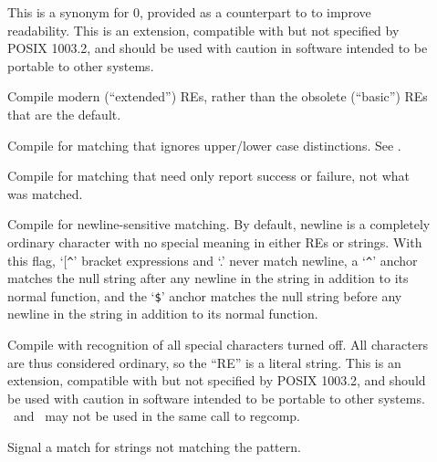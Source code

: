 \begin{description}

\item[] %
  This is a synonym for 0, provided as a counterpart to 
  to improve readability. This is an extension, compatible with but
  not specified by POSIX 1003.2, and should be used with caution in
  software intended to be portable to other systems.
\item[] %
  Compile modern (``extended'') REs, rather than the obsolete
  (``basic'') REs that are the default.
\item[] %
  Compile for matching that ignores upper/lower case distinctions. See
  .
\item[] %
  Compile for matching that need only report success or failure, not
  what was matched.
\item[] %
  Compile for newline-sensitive matching. By default, newline is a
  completely ordinary character with no special meaning in either REs
  or strings. With this flag, `[\verb|^|' bracket expressions and `.'
  never match newline, a `\verb|^|' anchor matches the null string
  after any newline in the string in addition to its normal function,
  and the `\verb|$|' anchor matches the null string before any newline
  in the string in addition to its normal function.
\item[] %
  Compile with recognition of all special characters turned off. All
  characters are thus considered ordinary, so the ``RE'' is a literal
  string. This is an extension, compatible with but not specified by
  POSIX 1003.2, and should be used with caution in software intended
  to be portable to other systems. \ and
  \ may not be used in the same call to regcomp.
\item[]
  Signal a match for strings not matching the pattern.



\end{description}

